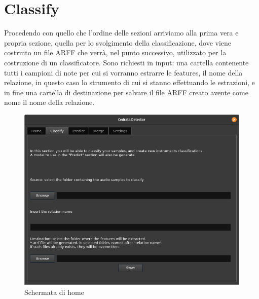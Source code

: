 \section{Classify}
Procedendo con quello che l'ordine delle sezioni arriviamo alla prima vera e propria sezione, quella per lo svolgimento della classificazione, dove viene costruito un file ARFF che verrà, nel punto successivo, utilizzato per la costruzione di un classificatore. Sono richiesti in input: una cartella contenente tutti i campioni di note per cui si vorranno estrarre le features, il nome della relazione, in questo caso lo strumento di cui si stanno effettuando le estrazioni, e in fine una cartella di destinazione per salvare il file ARFF creato avente come nome il nome della relazione.
\begin{figure}[h!]
	\begin{center}
		\includegraphics[scale=0.5]{./immagini/gui/classify.png}
	\end{center}
	\caption{Schermata di home}\label{fig:gui-classify}
\end{figure}

